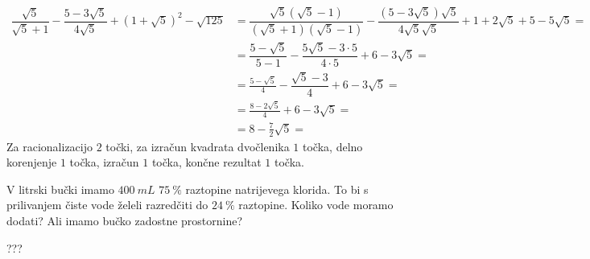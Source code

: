 \documentclass[addpoints,12pt]{exam}
\begin{document}
\begin{questions}
    \begin{solution}[7cm]
        \begin{align*} 
            \dfrac{\sqrt{5}}{\sqrt{5}+1}-\dfrac{5-3\sqrt{5}}{4\sqrt{5}}+\left(1+\sqrt{5}\right)^2-\sqrt{125}&=\dfrac{\sqrt{5}(\sqrt{5}-1)}{(\sqrt{5}+1)(\sqrt{5}-1)}-\dfrac{(5-3\sqrt{5})\sqrt{5}}{4\sqrt{5}\sqrt{5}}+1+2\sqrt{5}+5-5\sqrt{5}= \\
                                                                                                            &=\dfrac{5-\sqrt{5}}{5-1}-\dfrac{5\sqrt{5}-3\cdot 5}{4\cdot 5}+6-3\sqrt{5}= \\
                                                                                                            &=\frac{5-\sqrt{5}}{4}-\dfrac{\sqrt{5}-3}{4}+6-3\sqrt{5}= \\
                                                                                                            &=\frac{8-2\sqrt{5}}{4}+6-3\sqrt{5}= \\
                                                                                                            &=8-\frac{7}{2}\sqrt{5}= 
        \end{align*}
        Za racionalizacijo $2$ točki, za izračun kvadrata dvočlenika $1$ točka, delno korenjenje $1$ točka, izračun $1$ točka, končne rezultat $1$ točka.
    \end{solution}
    
    


    
    

\newpage
    \question[4]
    V litrski bučki imamo $400~mL$ $75~\%$ raztopine natrijevega klorida. To bi s prilivanjem čiste vode želeli razredčiti do $24~\%$ raztopine.
    Koliko vode moramo dodati? Ali imamo bučko zadostne prostornine?
    
    \begin{solution}[3cm]
        ???
    \end{solution}



\end{questions}
\end{document}
